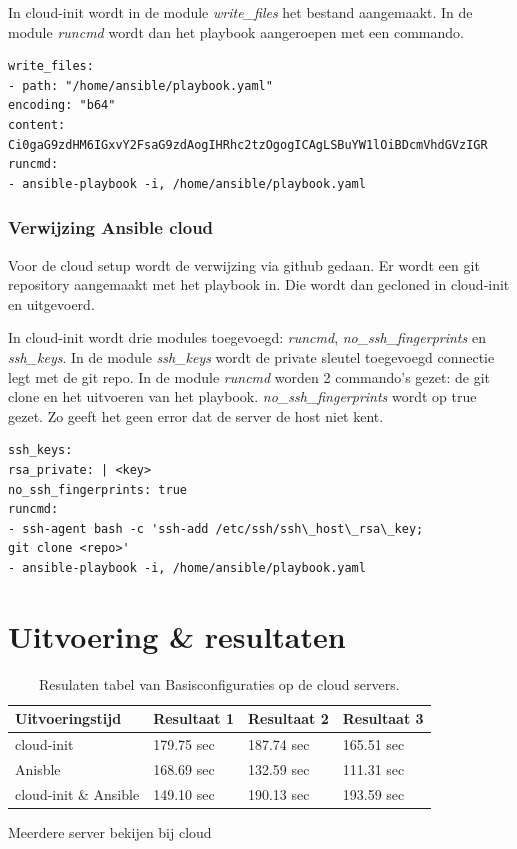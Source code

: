 In cloud-init wordt in de module \textit{write\_files} het bestand aangemaakt. In de module \textit{runcmd} wordt dan het playbook aangeroepen met een commando.
\begin{lstlisting}
write_files:
- path: "/home/ansible/playbook.yaml"
encoding: "b64"
content: Ci0gaG9zdHM6IGxvY2FsaG9zdAogIHRhc2tzOgogICAgLSBuYW1lOiBDcmVhdGVzIGR
runcmd:
- ansible-playbook -i, /home/ansible/playbook.yaml
\end{lstlisting}

\subsubsection{Verwijzing Ansible cloud}
Voor de cloud setup wordt de verwijzing via github gedaan. Er wordt een git repository aangemaakt met het playbook in. Die wordt dan gecloned in cloud-init en uitgevoerd.

In cloud-init wordt drie modules toegevoegd: \textit{runcmd}, \textit{no\_ssh\_fingerprints} en \textit{ssh\_keys}. In de module \textit{ssh\_keys} wordt de private sleutel toegevoegd connectie legt met de git repo. In de module \textit{runcmd} worden 2 commando's gezet: de git clone en het uitvoeren van het playbook. \textit{no\_ssh\_fingerprints} wordt op true gezet. Zo geeft het geen error dat de server de host niet kent.
\begin{lstlisting}
ssh_keys:
rsa_private: | <key>
no_ssh_fingerprints: true
runcmd:
- ssh-agent bash -c 'ssh-add /etc/ssh/ssh\_host\_rsa\_key; 
git clone <repo>'
- ansible-playbook -i, /home/ansible/playbook.yaml
\end{lstlisting}

\section{Uitvoering \& resultaten}


\begin{table}[!htb]
	\centering
	\begin{tabular}{| l | l | l |l |}
		\hline
		\textbf{Uitvoeringstijd} & Resultaat 1 & Resultaat 2 & Resultaat 3   \\ \hline
		cloud-init & 179.75 sec & 187.74 sec & 165.51 sec  \\ \hline
		Anisble & 168.69 sec & 132.59 sec & 111.31 sec \\ \hline
		cloud-init \& Ansible & 149.10 sec & 190.13 sec & 193.59 sec \\
		\hline
	\end{tabular}
	\caption{Resulaten tabel van Basisconfiguraties op de cloud servers.}
	\label{tab:tabel cloud resultaten basis}
\end{table}

Meerdere server bekijen bij cloud
